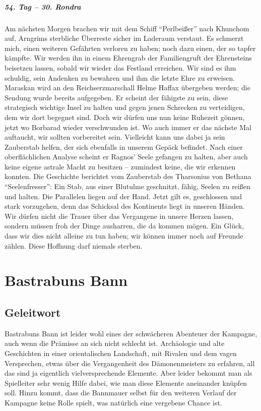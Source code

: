 \paragraph{54. Tag -- 30. Rondra}
Am nächsten Morgen brachen wir mit dem Schiff ``Perlbeißer'' nach Khunchom auf, Arngrims sterbliche Überreste sicher im Laderaum verstaut. Es schmerzt mich, einen weiteren Gefährten verloren zu haben; noch dazu einen, der so tapfer kämpfte. Wir werden ihn in einem Ehrengrab der Familiengruft der Ehrensteins beisetzen lassen, sobald wir wieder das Festland erreichen. Wir sind es ihm schuldig, sein Andenken zu bewahren und ihm die letzte Ehre zu erweisen. Maraskan wird an den Reichserzmarschall Helme Haffax übergeben werden; die Sendung wurde bereits aufgegeben. Er scheint der fähigste zu sein, diese strategisch wichtige Insel zu halten und gegen jenen Schrecken zu verteidigen, dem wir dort begegnet sind. Doch wir dürfen uns nun keine Ruhezeit gönnen, jetzt wo Borbarad wieder verschwunden ist. Wo auch immer er das nächste Mal auftaucht, wir sollten vorbereitet sein. Vielleicht kann uns dabei ja sein Zauberstab helfen, der sich ebenfalls in unserem Gepäck befindet. Nach einer oberflächlichen Analyse scheint er Ragnos' Seele gefangen zu halten, aber auch keine eigene astrale Macht zu besitzen -- zumindest keine, die wir erkennen konnten. Die Geschichte berichtet vom Zauberstab des Tharsonius von Bethana ``Seelenfresser'': Ein Stab, aus einer Blutulme geschnitzt, fähig, Seelen zu reißen und halten. Die Parallelen liegen auf der Hand. Jetzt gilt es, geschlossen und stark vorzugehen, denn das Schicksal des Kontinents liegt in unseren Händen. Wir dürfen nicht die Trauer über das Vergangene in unsere Herzen lassen, sondern müssen froh der Dinge ausharren, die da kommen mögen. Ein Glück, dass wir dies nicht alleine zu tun haben; wir können immer noch auf Freunde zählen. Diese Hoffnung darf niemals sterben.

\chapter{Bastrabuns Bann}

\section{Geleitwort}

Bastrabuns Bann ist leider wohl eines der schwächeren Abenteuer der Kampagne, auch wenn die Prämisse an sich nicht schlecht ist.
Archäologie und alte Geschichten in einer orientalischen Landschaft, mit Rivalen und dem vagen Versprechen, etwas über die Vergangenheit des Dämonenmeisters zu erfahren, all das sind ja eigentlich vielversprechende Elemente.
Aber leider bekommt man als Spielleiter sehr wenig Hilfe dabei, wie man diese Elemente aneinander knüpfen soll.
Hinzu kommt, dass die Bannmauer selbst für den weiteren Verlauf der Kampagne keine Rolle spielt, was natürlich eine vergebene Chance ist.

